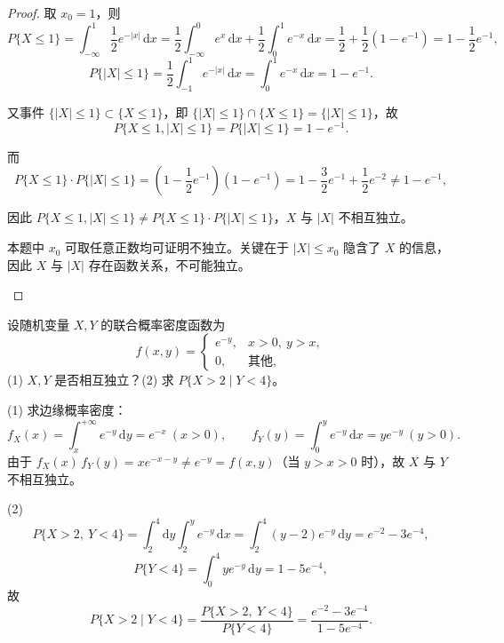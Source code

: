 \documentclass[lang=cn,11pt]{elegantbook}
\begin{document}
\begin{proof}
取 $x_0 = 1$，则
\[
P\{X \leqslant 1\} = \int_{-\infty}^1 \frac{1}{2}e^{-|x|}\,\mathrm{d}x = \frac{1}{2}\int_{-\infty}^0 e^x\,\mathrm{d}x + \frac{1}{2}\int_0^1 e^{-x}\,\mathrm{d}x = \frac{1}{2} + \frac{1}{2}(1 - e^{-1}) = 1 - \frac{1}{2}e^{-1},
\]
\[
P\{|X| \leqslant 1\} = \frac{1}{2}\int_{-1}^1 e^{-|x|}\,\mathrm{d}x = \int_0^1 e^{-x}\,\mathrm{d}x = 1 - e^{-1}.
\]

又事件 $\{|X| \leqslant 1\} \subset \{X \leqslant 1\}$，即 $\{|X| \leqslant 1\} \cap \{X \leqslant 1\} = \{|X| \leqslant 1\}$，故
\[
P\{X \leqslant 1, |X| \leqslant 1\} = P\{|X| \leqslant 1\} = 1 - e^{-1}.
\]

而
\[
P\{X \leqslant 1\} \cdot P\{|X| \leqslant 1\} = \left(1 - \frac{1}{2}e^{-1}\right)(1 - e^{-1}) = 1 - \frac{3}{2}e^{-1} + \frac{1}{2}e^{-2} \neq 1 - e^{-1},
\]

因此 $P\{X \leqslant 1, |X| \leqslant 1\} \neq P\{X \leqslant 1\} \cdot P\{|X| \leqslant 1\}$，$X$ 与 $|X|$ 不相互独立。

\begin{note}
本题中 $x_0$ 可取任意正数均可证明不独立。关键在于 $|X| \leqslant x_0$ 隐含了 $X$ 的信息，因此 $X$ 与 $|X|$ 存在函数关系，不可能独立。
\end{note}
\end{proof}

\begin{exercise}[判断独立性与条件概率] \label{exer:3-5d}
设随机变量 $X, Y$ 的联合概率密度函数为
\[
f(x,y) = \begin{cases} e^{-y}, & x > 0,\ y > x, \\ 0, & \text{其他}, \end{cases}
\]
(1) $X, Y$ 是否相互独立？(2) 求 $P\{X > 2 \mid Y < 4\}$。
\end{exercise}

\begin{solution}
(1) 求边缘概率密度：
\[
f_X(x) = \int_x^{+\infty} e^{-y}\,\mathrm{d}y = e^{-x}\ (x > 0), \qquad f_Y(y) = \int_0^y e^{-y}\,\mathrm{d}x = ye^{-y}\ (y > 0).
\]
由于 $f_X(x)\,f_Y(y) = x e^{-x-y} \neq e^{-y} = f(x,y)$（当 $y > x > 0$ 时），故 $X$ 与 $Y$ 不相互独立。

(2)
\[
P\{X > 2,\ Y < 4\} = \int_2^4\mathrm{d}y\int_2^y e^{-y}\,\mathrm{d}x = \int_2^4(y-2)e^{-y}\,\mathrm{d}y = e^{-2} - 3e^{-4},
\]
\[
P\{Y < 4\} = \int_0^4 ye^{-y}\,\mathrm{d}y = 1 - 5e^{-4},
\]
故
\[
P\{X > 2 \mid Y < 4\} = \frac{P\{X > 2,\ Y < 4\}}{P\{Y < 4\}} = \frac{e^{-2} - 3e^{-4}}{1 - 5e^{-4}}.
\]
\end{solution}
\end{document}
